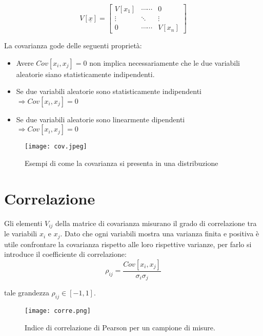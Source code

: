 \begin{equation}
	V[\underline{x}] = \begin{bmatrix}
		V[x_1] & \cdots \cdots	& 0 \\
		\vdots &\ddots & \vdots \\
		0 & \cdots \cdots & V[x_n]
	\end{bmatrix}
\end{equation}
\newline

La covarianza gode delle seguenti propriet\`{a}:
\begin{itemize}
	\item Avere $Cov[x_i,x_j] = 0 $ non implica necessariamente che le due variabili aleatorie siano statisticamente indipendenti.
	\item Se due variabili aleatorie sono statisticamente indipendenti \\ $\Rightarrow Cov[x_i,x_j] = 0 $
	\item Se due variabili aleatorie sono linearmente dipendenti \\$\Rightarrow Cov[x_i,x_j] = 0 $
\end{itemize}
 
 
\begin{figure}[ht]

\texttt{[image: cov.jpeg]}	
\centering
\caption{Esempi di come la covarianza si presenta in una distribuzione}
\end{figure} 

\section{Correlazione}
Gli elementi $V_{ij}$ della matrice di covarianza misurano il grado di correlazione tra le variabili $x_i$ e $x_j$. Dato che ogni variabili mostra una varianza finita e positiva \`{e} utile confrontare la covarianza  rispetto alle loro rispettive varianze, per farlo si introduce il coefficiente di correlazione:
\begin{equation}
	\rho_{ij} = \dfrac{Cov[x_i,x_j]}{\sigma_i \sigma_j}
\end{equation}

tale grandezza $\rho_{ij} \in [-1,1]$.

\begin{figure}[ht]
\vspace{0.2in}
\texttt{[image: corre.png]}	
\centering
\vspace{0.2in}
\caption{Indice di correlazione di Pearson per un campione di misure.}
\end{figure} 

